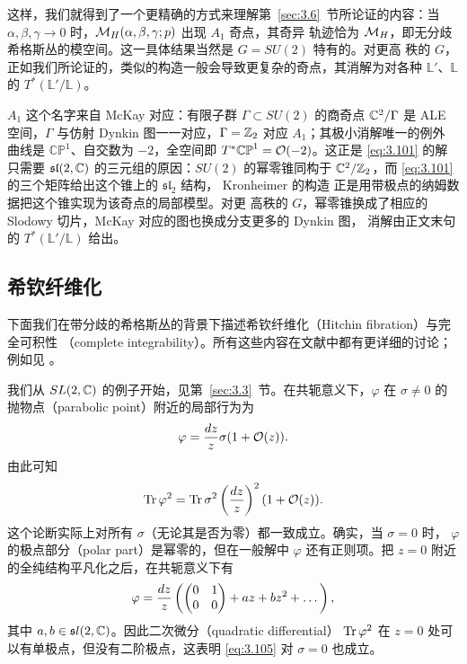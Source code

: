 这样，我们就得到了一个更精确的方式来理解第~\ref{sec:3.6}~节所论证的内容：当
$\alpha,\beta,\gamma\to 0$ 时，${{\mathcal{M}}_H}(\alpha,\beta,\gamma;p)$ 出现 $A_1$ 奇点，其奇异
轨迹恰为 ${{\mathcal{M}}_H}$，即无分歧希格斯丛的模空间。这一具体结果当然是 $G=SU(2)$ 特有的。对更高
秩的 $G$，正如我们所论证的，类似的构造一般会导致更复杂的奇点，其消解为对各种
$\mathbb{L}'$、$\mathbb{L}$ 的 $T^*(\mathbb{L}'/\mathbb{L})$。

\begin{yizhu}[物理图像补充]
$A_1$ 这个名字来自 McKay 对应：有限子群 $\Gamma\subset SU(2)$ 的商奇点 ${\mathbb{C}}^2/\Gamma$ 是 ALE
空间，$\Gamma$ 与仿射 Dynkin 图一一对应，$\Gamma={\mathbb{Z}}_2$ 对应 $A_1$；其极小消解唯一的例外
曲线是 $\mathbb{CP}^1$、自交数为 $-2$，全空间即 $T^*\mathbb{CP}^1={\mathcal O}(-2)$。这正是
\eqref{eq:3.101} 的解只需要 $\mathfrak{sl}(2,{\mathbb{C}})$ 的三元组的原因：$SU(2)$ 的幂零锥同构于
${\mathbb{C}}^2/{\mathbb{Z}}_2$，而 \eqref{eq:3.101} 的三个矩阵给出这个锥上的 $\mathfrak{sl}_2$ 结构，
Kronheimer 的构造 \cite{ref35} 正是用带极点的纳姆数据把这个锥实现为该奇点的局部模型。对更
高秩的 $G$，幂零锥换成了相应的 Slodowy 切片，McKay 对应的图也换成分支更多的 Dynkin 图，
消解由正文末句的 $T^*(\mathbb{L}'/\mathbb{L})$ 给出。
\end{yizhu}

\subsection{希钦纤维化}
\label{sec:3.9}

下面我们在带分歧的希格斯丛的背景下描述希钦纤维化（Hitchin fibration）与完全可积性
（complete integrability）。所有这些内容在文献中都有更详细的讨论；例如见
\cite{ref67,ref68}。

我们从 $SL(2,{\mathbb{C}})$ 的例子开始，见第~\ref{sec:3.3}~节。在共轭意义下，$\varphi$ 在
$\sigma\not=0$ 的抛物点（parabolic point）附近的局部行为为
\setcounter{equation}{103}
\begin{equation}\label{eq:3.104}
  \varphi={dz\over z}\sigma(1+{\mathcal O}(z)).
\end{equation}
由此可知
\setcounter{equation}{104}
\begin{equation}\label{eq:3.105}
  {\rm Tr}\,\varphi^2={\rm Tr}\,\sigma^2 \left({dz\over z}\right)^2(1+{\mathcal O}(z)).
\end{equation}
这个论断实际上对所有 $\sigma$（无论其是否为零）都一致成立。确实，当 $\sigma=0$ 时，
$\varphi$ 的极点部分（polar part）是幂零的，但在一般解中 $\varphi$ 还有正则项。把
$z=0$ 附近的全纯结构平凡化之后，在共轭意义下有
\setcounter{equation}{105}
\begin{equation}\label{eq:3.106}
  \varphi={dz\over z}\left(\left(\begin{matrix}0&1\\ 0&0\end{matrix}\right)+az+bz^2+\dots\right),
\end{equation}
其中 $a,b\in {\mathfrak sl}(2,{\mathbb{C}})$。因此二次微分（quadratic differential）
${\rm Tr}\,\varphi^2$ 在 $z=0$ 处可以有单极点，但没有二阶极点，这表明 \eqref{eq:3.105}
对 $\sigma=0$ 也成立。

